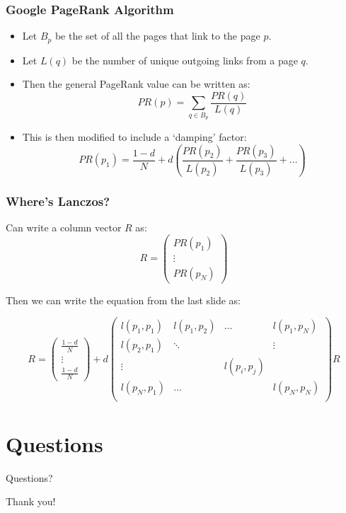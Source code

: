 \documentclass[pdf]{beamer}
\begin{document}
\begin{frame}
\frametitle{Google PageRank Algorithm}
\begin{itemize}
\item Let $B_p$ be the set of all the pages that link to the page $p$.
\item Let $L(q)$ be the number of unique outgoing links from a page $q$.
\item Then the general PageRank value can be written as: \[PR(p) = \sum_{q \in B_p} \frac{PR(q)}{L(q)} \]
\item This is then modified to include a `damping' factor: \[ PR(p_1) = \frac{1-d}{N} + d \left( \frac{PR(p_2)}{L(p_2)} + \frac{PR(p_3)}{L(p_3)} + \dots \right) \]
\end{itemize}
\end{frame}


\begin{frame}
\frametitle{Where's Lanczos?}

Can write a column vector $R$ as: \[R = \left( \begin{array}{c} PR(p_1) \\ \vdots \\ PR(p_N) \end{array} \right) \]

Then we can write the equation from the last slide as:

\[ R = \left( \begin{array}{c} \frac{1-d}{N} \\ \vdots \\ \frac{1-d}{N} \end{array} \right) +d \left( \begin{array}{cccc}
l(p_1,p_1) & l(p_1,p_2) & \dots & l(p_1,p_N)\\
l(p_2,p_1) & \ddots & & \vdots \\
\vdots & & l(p_i,p_j) & \\
l(p_N,p_1) & \dots & & l(p_N,p_N)\\
 \end{array} \right) R \]
\end{frame}

\begin{frame}

\end{frame}




\section{Questions}

\begin{frame}
\tableofcontents[currentsection]
\end{frame}

\begin{frame}
\centering
Questions?
\end{frame}

\begin{frame}
\centering
Thank you!
\end{frame}
\end{document}
